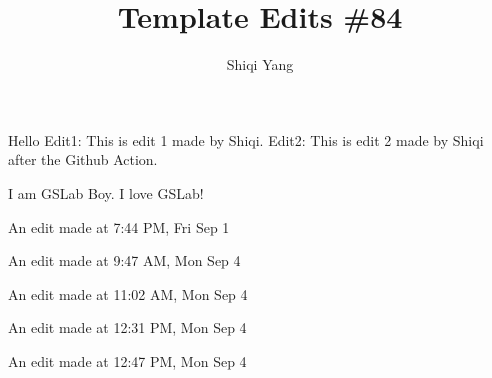 \documentclass{report}
\title{\Huge{Template Edits \#84}\\}
\author{\huge{Shiqi Yang}}
\date{}
\begin{document}
\maketitle
Hello
Edit1: This is edit 1 made by Shiqi.
Edit2: This is edit 2 made by Shiqi after the Github Action.


I am GSLab Boy. I love GSLab!

An edit made at 7:44 PM, Fri Sep 1

An edit made at 9:47 AM, Mon Sep 4

An edit made at 11:02 AM, Mon Sep 4

An edit made at 12:31 PM, Mon Sep 4

An edit made at 12:47 PM, Mon Sep 4
\end{document}
